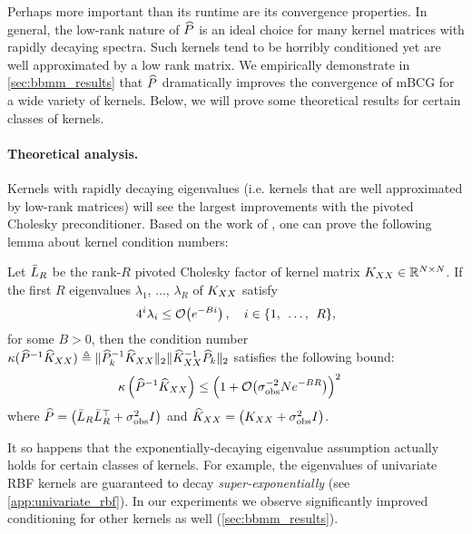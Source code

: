 Perhaps more important than its runtime are its convergence properties.
In general, the low-rank nature of $\widehat{P}$ is an ideal choice for many kernel matrices with rapidly decaying spectra.
Such kernels tend to be horribly conditioned yet are well approximated by a low rank matrix.
We empirically demonstrate in \cref{sec:bbmm_results} that $\widehat{P}$ dramatically improves the convergence of mBCG for a wide variety of kernels.
Below, we will prove some theoretical results for certain classes of kernels.


\paragraph{Theoretical analysis.}
Kernels with rapidly decaying eigenvalues (i.e. kernels that are well approximated by low-rank matrices) will see the largest improvements with the pivoted Cholesky preconditioner.
Based on the work of \citet{harbrecht2012low}, one can prove the following lemma about kernel condition numbers:
%
\begin{lemma}
  \label{thm:condition_number}
  Let $\bar{L}_{R}$ be the rank-$R$ pivoted Cholesky factor of kernel matrix $K_{XX} \in \mathbb{R}^{N \times N}$.
  If the first $R$ eigenvalues $\lambda_1$, $\ldots$, $\lambda_R$ of $K_{XX}$ satisfy
	\begin{equation}
		4^{i}\lambda_{i} \leq \bigo{e^{-Bi}}, \quad i \in \{ 1, \:\: \ldots, \:\: R \},
		\label{eqn:pcp_condition}
	\end{equation}
	for some $B>0$, then the condition number $\kappa(\widehat{P}^{-1}\widehat{K}_{XX}) \triangleq \Vert \widehat{P}_{k}^{-1}\widehat{K}_{XX} \Vert_{2} \Vert \widehat{K}_{XX}^{-1}\widehat{P}_{k} \Vert_{2}$
	satisfies the following bound:
  \begin{align}
    \kappa \left( \trainP^{-1}\trainK \right)
    &\leq \Bigl( 1 + \bigo{\sigma^{-2}_\text{obs} N e^{-BR}} \Bigr)^2
		\nonumber
  \end{align}
	where $\widehat{P} = \left( \bar{L}_R \bar{L}_R^\top + \sigma^2_\text{obs} I \right)$ and $\widehat{K}_{XX} = \left( K_{XX} + \sigma^2_\text{obs} I \right)$.
\end{lemma}
%
It so happens that the exponentially-decaying eigenvalue assumption actually holds for certain classes of kernels.
For example, the eigenvalues of univariate RBF kernels are guaranteed to decay \emph{super-exponentially} (see \cref{app:univariate_rbf}).
In our experiments we observe significantly improved conditioning for other kernels as well (\cref{sec:bbmm_results}).

